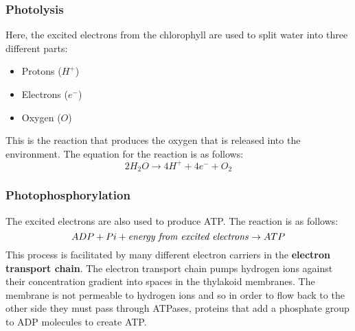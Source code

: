 \documentclass{article}
\begin{document}
\subsubsection*{Photolysis}
Here, the excited electrons from the chlorophyll are used to split water into
three different parts:
\begin{itemize}
	\item Protons ($H^{+}$)
	\item Electrons ($e^{-}$)
	\item Oxygen ($O$)
\end{itemize}
This is the reaction that produces the oxygen that is released into the
environment. The equation for the reaction is as follows:
\[
	2H_2O \rightarrow 4H^+ + 4e^- + O_2
\]

\subsubsection*{Photophosphorylation}
The excited electrons are also used to produce ATP. The reaction is as follows:
\[
	ADP + Pi + \textrm{\textit{energy from excited electrons}} \rightarrow ATP
\]
This process is facilitated by many different electron carriers in the
\textbf{electron transport chain}. The electron transport chain pumps hydrogen
ions against their concentration gradient into spaces in the thylakoid
membranes. The membrane is not permeable to hydrogen ions and so in order to
flow back to the other side they must pass through ATPases, proteins that add a
phosphate group to ADP molecules to create ATP.

\begin{center}
\end{center}
\end{document}

